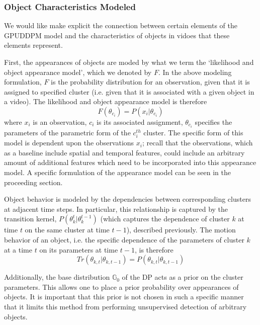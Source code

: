 \documentclass[twocolumn, final]{svjour3}
\begin{document}
\subsubsection{Object Characteristics Modeled}

We would like make explicit the connection between certain elements of the GPUDDPM model and the characteristics of objects in vidoes that these elements represent.

First, the appearances of objects are moded by what we term the `likelihood and object appearance model', which we denoted by $F$. In the above modeling formulation, $F$ is the probability distribution for an observation, given that it is assigned to specified cluster (i.e. given that it is associated with a given object in a video). The likelihood and object appearance model is therefore
\begin{equation}
F(\theta_{c_{i}}) = P(x_{i}|\theta_{c_{i}})
\end{equation}
where $x_{i}$ is an observation, $c_{i}$ is its associated assignment, $\theta_{c_{i}}$ specifies the parameters of the parametric form of the $c_{i}^{th}$ cluster. The specific form of this model is dependent upon the observations $x_{i}$; recall that the observations, which as a baseline include spatial and temporal features, could include an arbitrary amount of additional features which need to be incorporated into this appearance model. A specific formulation of the appearance model can be seen in the proceeding section.

Object behavior is modeled by the dependencies between corresponding clusters at adjacent time steps. In particular, this relationship is captured by the transition kernel, $P(\theta_{k}^{t} | \theta_{k}^{t-1})$ (which captures the dependence of cluster $k$ at time $t$ on the same cluster at time $t-1$), described previously. The motion behavior of an object, i.e. the specific dependence of the parameters of cluster $k$ at a time $t$ on its parameters at time $t-1$, is therefore
\begin{equation}
Tr(\theta_{k, t} | \theta_{k, t-1}) = P(\theta_{k, t} | \theta_{k, t-1})
\end{equation}

Additionally, the base distribution $\mathbb{G}_{0}$ of the DP acts as a prior on the cluster parameters. This allows one to place a prior probability over appearances of objects. It is important that this prior is not chosen in such a specific manner that it limits this method from performing unsupervised detection of arbitrary objects.
\end{document}
